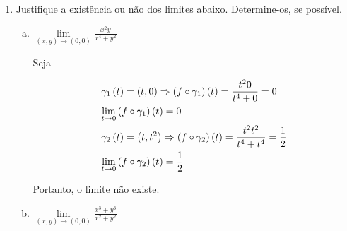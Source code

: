 \documentclass{book}
\begin{document}
\begin{enumerate}
\begin{sol}
\begin{enumerate}[(a)]
Implica que, $\exists c \in \left] {a,b} \right[$ tal que $g'\left( c \right) = 0$. Ent\~ao,

\[
\begin{gathered}
0 = g'\left( c \right) = f'\left( c \right) - d \hfill \\
\Rightarrow f'\left( c \right) = d \hfill \\
\end{gathered}
\]

Ainda, $f'$ crescente, implica que, $f'$ \'e cont\'inua.

\end{enumerate}

\end{sol}

\newpage 

\textbf{Grupo 2: C\'alculo em v\'arias vari\'aveis reais.}

  \item Justifique a exist\^encia ou n\~ao dos limites abaixo. Determine-os, se poss\'ivel.

\begin{enumerate}[(a)]
\item $\mathop {\lim }\limits_{\left( {x,y} \right) \to \left( {0,0} \right)} \displaystyle \frac{{x^2 y}}{{x^4  + y^2 }}$

\begin{sol}
Seja

\[
\begin{gathered}
  \gamma _1 \left( t \right) = \left( {t,0} \right) \Rightarrow \left( {f \circ \gamma _1 } \right)\left( t \right) = \frac{{t^2 0}}
{{t^4  + 0}} = 0 \hfill \\
  \mathop {\lim }\limits_{t \to 0} \left( {f \circ \gamma _1 } \right)\left( t \right) = 0 \hfill \\
  \gamma _2 \left( t \right) = \left( {t,t^2 } \right) \Rightarrow \left( {f \circ \gamma _2 } \right)\left( t \right) = \frac{{t^2 t^2 }}
{{t^4  + t^4 }} = \frac{1}
{2} \hfill \\
  \mathop {\lim }\limits_{t \to 0} \left( {f \circ \gamma _2 } \right)\left( t \right) = \frac{1}
{2} \hfill \\
\end{gathered}
\]

Portanto, o limite n\~ao existe.
\end{sol}

\item $\mathop {\lim }\limits_{\left( {x,y} \right) \to \left( {0,0} \right)} \displaystyle \frac{{x^3 + y^3}}{{x^2  + y^2 }}$


\end{enumerate}
\end{enumerate}
\end{document}
